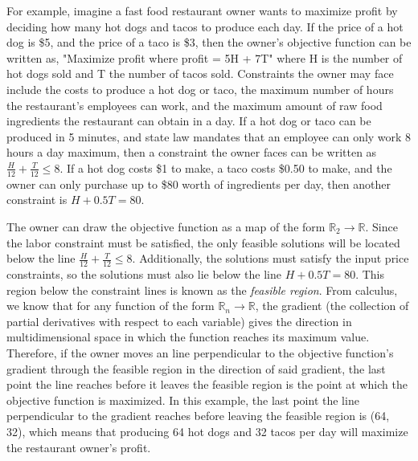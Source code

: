 \documentclass[5p,times,11pt]{elsarticle}
\begin{document}
For example, imagine a fast food restaurant owner wants to maximize profit by deciding how many hot dogs and tacos to produce each day. If the price of a hot dog is \$5, and the price of a taco is \$3, then the owner's objective function can be written as, "Maximize profit where profit = 5H + 7T" where H is the number of hot dogs sold and T the number of tacos sold. Constraints the owner may face include the costs to produce a hot dog or taco, the maximum number of hours the restaurant's employees can work, and the maximum amount of raw food ingredients the restaurant can obtain in a day. If a hot dog or taco can be produced in 5 minutes, and state law mandates that an employee can only work 8 hours a day maximum, then a constraint the owner faces can be written as $\frac{H}{12} + \frac{T}{12} \leq 8$. If a hot dog costs \$1 to make, a taco costs \$0.50 to make, and the owner can only purchase up to \$80 worth of ingredients per day, then another constraint is $H + 0.5T = 80$.

The owner can draw the objective function as a map of the form $\mathbb{R}_2 \rightarrow  \mathbb{R}$. Since the labor constraint must be satisfied, the only feasible solutions will be located below the line $\frac{H}{12} + \frac{T}{12} \leq 8$. Additionally, the solutions must satisfy the input price constraints, so the solutions must also lie below the line $H + 0.5T = 80$. This region below the constraint lines is known as the \textit{feasible region}. From calculus, we know that for any function of the form $\mathbb{R}_n \rightarrow  \mathbb{R}$, the gradient (the collection of partial derivatives with respect to each variable) gives the direction in multidimensional space in which the function reaches its maximum value. Therefore, if the owner moves an line perpendicular to the objective function's gradient through the feasible region in the direction of said gradient, the last point the line reaches before it leaves the feasible region is the point at which the objective function is maximized. In this example, the last point the line perpendicular to the gradient reaches before leaving the feasible region is (64, 32), which means that producing 64 hot dogs and 32 tacos per day will maximize the restaurant owner's profit.
\end{document}
